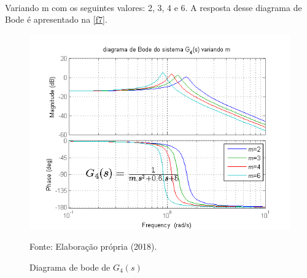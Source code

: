 \\\indent
Variando m com os seguintes valores: 2, 3, 4 e 6. A resposta desse diagrama de Bode é apresentado na \autoref{f7}.
\\
\begin{figure}[h!]
    \centering
    \caption{Diagrama de bode de $G_4(s)$}
    \includegraphics[scale=0.55]{img/task_7_07.png}
    \label{f7}
    \begin{flushleft}
        Fonte: Elaboração própria (2018).
    \end{flushleft}
\end{figure}
\\